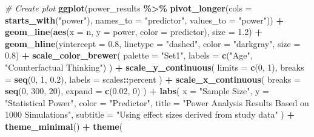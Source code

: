 \documentclass[
  doc]{apa6}
\newenvironment{Shaded}{\begin{snugshade}}{\end{snugshade}}
\newcommand{\AttributeTok}[1]{\textcolor[rgb]{0.13,0.29,0.53}{#1}}
\newcommand{\CommentTok}[1]{\textcolor[rgb]{0.56,0.35,0.01}{\textit{#1}}}
\newcommand{\DecValTok}[1]{\textcolor[rgb]{0.00,0.00,0.81}{#1}}
\newcommand{\FloatTok}[1]{\textcolor[rgb]{0.00,0.00,0.81}{#1}}
\newcommand{\FunctionTok}[1]{\textcolor[rgb]{0.13,0.29,0.53}{\textbf{#1}}}
\newcommand{\NormalTok}[1]{#1}
\newcommand{\SpecialCharTok}[1]{\textcolor[rgb]{0.81,0.36,0.00}{\textbf{#1}}}
\newcommand{\StringTok}[1]{\textcolor[rgb]{0.31,0.60,0.02}{#1}}
\begin{document}
\begin{Shaded}
\begin{Highlighting}[]
\CommentTok{\# Create plot}
\FunctionTok{ggplot}\NormalTok{(power\_results }\SpecialCharTok{\%\textgreater{}\%} 
       \FunctionTok{pivot\_longer}\NormalTok{(}\AttributeTok{cols =} \FunctionTok{starts\_with}\NormalTok{(}\StringTok{"power"}\NormalTok{),}
                   \AttributeTok{names\_to =} \StringTok{"predictor"}\NormalTok{,}
                   \AttributeTok{values\_to =} \StringTok{"power"}\NormalTok{)) }\SpecialCharTok{+}
  \FunctionTok{geom\_line}\NormalTok{(}\FunctionTok{aes}\NormalTok{(}\AttributeTok{x =}\NormalTok{ n, }\AttributeTok{y =}\NormalTok{ power, }\AttributeTok{color =}\NormalTok{ predictor), }
            \AttributeTok{size =} \FloatTok{1.2}\NormalTok{) }\SpecialCharTok{+}
  \FunctionTok{geom\_hline}\NormalTok{(}\AttributeTok{yintercept =} \FloatTok{0.8}\NormalTok{, }
             \AttributeTok{linetype =} \StringTok{"dashed"}\NormalTok{, }
             \AttributeTok{color =} \StringTok{"darkgray"}\NormalTok{,}
             \AttributeTok{size =} \FloatTok{0.8}\NormalTok{) }\SpecialCharTok{+}
  \FunctionTok{scale\_color\_brewer}\NormalTok{(}
    \AttributeTok{palette =} \StringTok{"Set1"}\NormalTok{,}
    \AttributeTok{labels =} \FunctionTok{c}\NormalTok{(}\StringTok{"Age"}\NormalTok{, }\StringTok{"Counterfactual Thinking"}\NormalTok{)}
\NormalTok{  ) }\SpecialCharTok{+}
  \FunctionTok{scale\_y\_continuous}\NormalTok{(}
    \AttributeTok{limits =} \FunctionTok{c}\NormalTok{(}\DecValTok{0}\NormalTok{, }\DecValTok{1}\NormalTok{),}
    \AttributeTok{breaks =} \FunctionTok{seq}\NormalTok{(}\DecValTok{0}\NormalTok{, }\DecValTok{1}\NormalTok{, }\FloatTok{0.2}\NormalTok{),}
    \AttributeTok{labels =}\NormalTok{ scales}\SpecialCharTok{::}\NormalTok{percent}
\NormalTok{  ) }\SpecialCharTok{+}
  \FunctionTok{scale\_x\_continuous}\NormalTok{(}
    \AttributeTok{breaks =} \FunctionTok{seq}\NormalTok{(}\DecValTok{0}\NormalTok{, }\DecValTok{300}\NormalTok{, }\DecValTok{20}\NormalTok{),}
    \AttributeTok{expand =} \FunctionTok{c}\NormalTok{(}\FloatTok{0.02}\NormalTok{, }\DecValTok{0}\NormalTok{)}
\NormalTok{  ) }\SpecialCharTok{+}
  \FunctionTok{labs}\NormalTok{(}
    \AttributeTok{x =} \StringTok{"Sample Size"}\NormalTok{,}
    \AttributeTok{y =} \StringTok{"Statistical Power"}\NormalTok{,}
    \AttributeTok{color =} \StringTok{"Predictor"}\NormalTok{,}
    \AttributeTok{title =} \StringTok{"Power Analysis Results Based on 1000 Simulations"}\NormalTok{,}
    \AttributeTok{subtitle =} \StringTok{"Using effect sizes derived from study data"}
\NormalTok{  ) }\SpecialCharTok{+}
  \FunctionTok{theme\_minimal}\NormalTok{() }\SpecialCharTok{+}
  \FunctionTok{theme}\NormalTok{(}

\end{Highlighting}
\end{Shaded}
\end{document}
